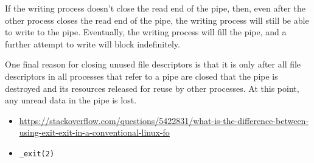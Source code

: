 \begin{itemize}
  If the writing process doesn't close the read end of the pipe, then, even after the
  other process closes the read end of the pipe, the writing process will still be able to
  write to the pipe. Eventually, the writing process will fill the pipe, and a further
  attempt to write will block indefinitely.

  One final reason for closing unused file descriptors is that it is only after all file
  descriptors in all processes that refer to a pipe are closed that the pipe is destroyed
  and its resources released for reuse by other processes. At this point, any unread data
  in the pipe is lost.
\end{itemize}

\begin{frame}
\end{frame}

\begin{itemize}
\item
  \url{https://stackoverflow.com/questions/5422831/what-is-the-difference-between-using-exit-exit-in-a-conventional-linux-fo}
\item \texttt{\_exit(2)}
\end{itemize}

